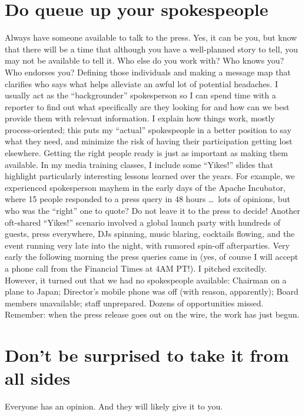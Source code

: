 \section*{Do queue up your spokespeople}
Always have someone available to talk to the press. Yes, it can be you, but know
that there will be a time that although you have a well-planned story to tell,
you may not be available to tell it. Who else do you work with? Who knows you?
Who endorses you? Defining those individuals and making a message map that
clarifies who says what helps alleviate an awful lot of potential headaches. I
usually act as the ``backgrounder'' spokesperson so I can spend time with a
reporter to find out what specifically are they looking for and how can we best
provide them with relevant information. I explain how things work, mostly
process-oriented; this puts my ``actual'' spokespeople in a better position to say
what they need, and minimize the risk of having their participation getting lost
elsewhere. Getting the right people ready is just as important as making them
available. In my media training classes, I include some ``Yikes!'' slides that
highlight particularly interesting lessons learned over the years. For example,
we experienced spokesperson mayhem in the early days of the Apache Incubator, where
15 people responded to a press query in 48 hours \dots\ lots of opinions, but who was the
``right'' one to quote? Do not leave it to the press to decide! Another oft-shared
``Yikes!'' scenario involved a global launch party with hundreds of guests, press
everywhere, DJs spinning, music blaring, cocktails flowing, and the event
running very late into the night, with rumored spin-off afterparties. Very early
the following morning the press queries came in (yes, of course I will accept a
phone call from the Financial Times at 4AM PT!). I pitched excitedly. However,
it turned out that we had no spokespeople available: Chairman on a plane to
Japan; Director's mobile phone was off (with reason, apparently); Board members
unavailable; staff unprepared. Dozens of opportunities missed. Remember: when
the press release goes out on the wire, the work has just begun.

\section*{Don't be surprised to take it from all sides}
Everyone has an opinion. And they will likely give it to you.

